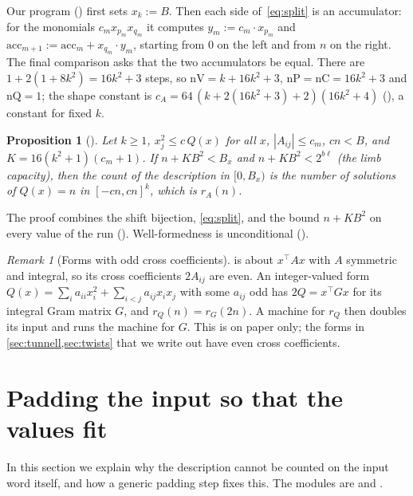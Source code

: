 \documentclass[10pt]{amsart}
\theoremstyle{plain}
\newtheorem{proposition}[theorem]{Proposition}
\theoremstyle{definition}
\theoremstyle{remark}
\newtheorem{remark}[theorem]{Remark}
\numberwithin{equation}{section}
\begin{document}
Our program () first sets $x_k:=B$. Then each side of~\eqref{eq:split} is an accumulator: for
the monomials $c_mx_{p_m}x_{q_m}$ it computes $y_m:=c_m\cdot x_{p_m}$ and $\mathrm{acc}_{m+1}:=\mathrm{acc}_m+x_{q_m}\cdot y_m$,
starting from $0$ on the left and from $n$ on the right. The final comparison asks that the two accumulators be
equal. There are $1+2(1+8k^2)=16k^2+3$ steps, so $\mathrm{nV}=k+16k^2+3$, $\mathrm{nP}=\mathrm{nC}=16k^2+3$ and
$\mathrm{nQ}=1$; the shape constant is $c_A=64\,(k+2(16k^2+3)+2)(16k^2+4)$ (), a constant
for fixed $k$.

\begin{proposition}[]\label{prop:count}
Let $k\ge1$, $x_j^2\le c\,Q(x)$ for all $x$, $|A_{ij}|\le c_m$, $cn<B$, and $K=16(k^2+1)(c_m+1)$. If $n+KB^2<B_x$ and
$n+KB^2<2^{b\ell}$ (the limb capacity), then the count of the description in $[0,B_x)$ is the number of
solutions of $Q(x)=n$ in $[-cn,cn]^k$, which is $r_A(n)$.
\end{proposition}

\noindent The proof combines the shift bijection, \eqref{eq:split}, and the bound $n+KB^2$ on every value of
the run (). Well-formedness is unconditional ().

\begin{remark}[Forms with odd cross coefficients]\label{rem:odd}
 is about $x^{\top}Ax$ with $A$ symmetric and integral, so its cross coefficients
$2A_{ij}$ are even. An integer-valued form $Q(x)=\sum_ia_{ii}x_i^2+\sum_{i<j}a_{ij}x_ix_j$ with some $a_{ij}$
odd has $2Q=x^{\top}Gx$ for its integral Gram matrix $G$, and $r_Q(n)=r_G(2n)$. A machine for $r_Q$ then
doubles its input and runs the machine for $G$. This is on paper only; the forms in
\cref{sec:tunnell,sec:twists} that we write out have even cross coefficients.
\end{remark}

\section{Padding the input so that the values fit}\label{sec:padding}

In this section we explain why the description cannot be counted on the input word itself, and how a
generic padding step fixes this. The modules are  and .
\end{document}
